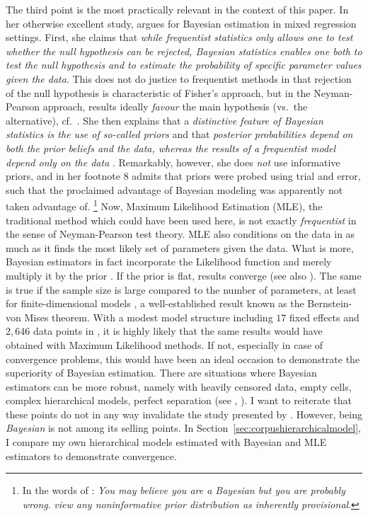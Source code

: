 \documentclass[USenglish]{article}
\begin{document}
The third point is the most practically relevant in the context of this paper.
In her otherwise excellent study, \citet[251--252]{Levshina2016} argues for Bayesian estimation in mixed regression settings.
First, she claims that \textit{while frequentist statistics only allows one to test whether the null hypothesis can be rejected, Bayesian statistics enables one both to test the null hypothesis and to estimate the probability of specific parameter values given the data}.
This does not do justice to frequentist methods in that rejection of the null hypothesis is characteristic of Fisher's approach, but in the Neyman-Pearson approach, results ideally \textit{favour} the main hypothesis (vs.\ the alternative), cf.\ \cite{Lehmann1993,Lehmann2011,Perezgonzalez2015}.
She then explains that a \textit{distinctive feature of Bayesian statistics is the use of so-called priors} and that \textit{posterior probabilities depend on both the prior beliefs and the data, whereas the results of a frequentist model depend only on the data} \cite[252]{Levshina2016}.
Remarkably, however, she does \textit{not} use informative priors, and in her footnote 8 \cite[252]{Levshina2016} admits that priors were probed using trial and error, such that the proclaimed advantage of Bayesian modeling was apparently not taken advantage of.%
\footnote{In the words of \cite{Senn2011}: \textit{You may believe you are a Bayesian but you are probably wrong}.
\cite[347--348]{GelmanHill2006} \textit{view any noninformative prior distribution as inherently provisional}.}
Now, Maximum Likelihood Estimation (MLE), the traditional method which could have been used here, is not exactly \textit{frequentist} in the sense of Neyman-Pearson test theory.
MLE also conditions on the data in as much as it finds the most likely set of parameters given the data.
What is more, Bayesian estimators in fact incorporate the Likelihood function and merely multiply it by the prior \citep[PAGENUMBER??]{GelmanEa2014}.
If the prior is flat, results converge (see also \citealp[347]{GelmanHill2006}).
The same is true if the sample size is large compared to the number of parameters, at least for finite-dimensional models \citep[1119--1120]{Freedman1999}, a well-established result known as the Bernstein-von Mises theorem.
With a modest model structure including $17$ fixed effects and $2,646$ data points in \cite{Levshina2016}, it is highly likely that the same results would have obtained with Maximum Likelihood methods.
If not, especially in case of convergence problems, this would have been an ideal occasion to demonstrate the superiority of Bayesian estimation.
There are situations where Bayesian estimators can be more robust, namely with heavily censored data, empty cells, complex hierarchical models, perfect separation (see \citealp{Freedman1999}, \cite[345--348]{GelmanHill2006}).
I want to reiterate that these points do not in any way invalidate the study presented by \cite{Levshina2016}.
However, being \textit{Bayesian} is not among its selling points.
In Section~\ref{sec:corpushierarchicalmodel}, I compare my own hierarchical models estimated with Bayesian and MLE estimators to demonstrate convergence.
\end{document}
